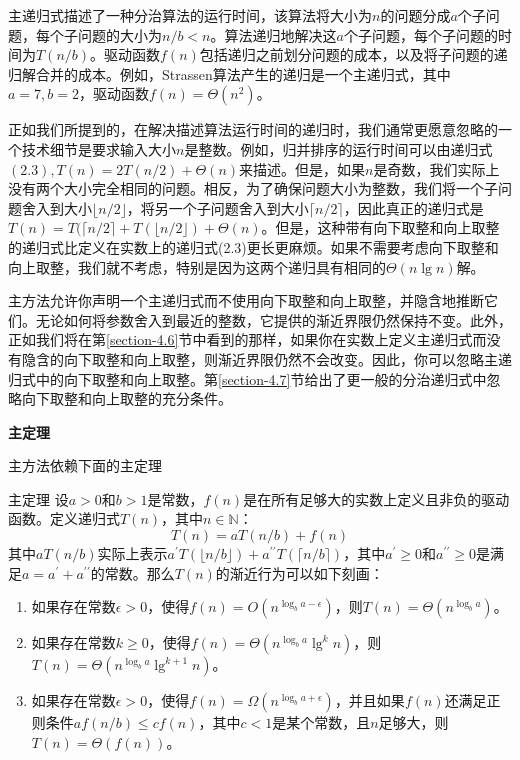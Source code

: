 \documentclass[lang=cn,newtx,10pt,scheme=chinese]{elegantbook}
\begin{document}
主递归式描述了一种分治算法的运行时间，该算法将大小为$n$的问题分成$a$个子问题，每个子问题的大小为$n / b<n$。算法递归地解决这$a$个子问题，每个子问题的时间为$T(n / b)$。驱动函数$f(n)$包括递归之前划分问题的成本，以及将子问题的递归解合并的成本。例如，Strassen算法产生的递归是一个主递归式，其中$a=7, b=2$，驱动函数$f(n)=\Theta(n^2)$。

正如我们所提到的，在解决描述算法运行时间的递归时，我们通常更愿意忽略的一个技术细节是要求输入大小$n$是整数。例如，归并排序的运行时间可以由递归式$(2.3), T(n)=2 T(n / 2)+\Theta(n)$来描述。但是，如果$n$是奇数，我们实际上没有两个大小完全相同的问题。相反，为了确保问题大小为整数，我们将一个子问题舍入到大小$\lfloor n / 2\rfloor$，将另一个子问题舍入到大小$\lceil n / 2\rceil$，因此真正的递归式是$T(n)=T(\lceil n / 2\rceil+T(\lfloor n / 2\rfloor)+\Theta(n)$。但是，这种带有向下取整和向上取整的递归式比定义在实数上的递归式(2.3)更长更麻烦。如果不需要考虑向下取整和向上取整，我们就不考虑，特别是因为这两个递归具有相同的$\Theta(n \lg n)$解。

主方法允许你声明一个主递归式而不使用向下取整和向上取整，并隐含地推断它们。无论如何将参数舍入到最近的整数，它提供的渐近界限仍然保持不变。此外，正如我们将在第\ref{section-4.6}节中看到的那样，如果你在实数上定义主递归式而没有隐含的向下取整和向上取整，则渐近界限仍然不会改变。因此，你可以忽略主递归式中的向下取整和向上取整。第\ref{section-4.7}节给出了更一般的分治递归式中忽略向下取整和向上取整的充分条件。

\textbf{主定理}

主方法依赖下面的主定理

\begin{theorem}{主定理}{}
设$a>0$和$b>1$是常数，$f(n)$是在所有足够大的实数上定义且非负的驱动函数。定义递归式$T(n)$，其中$n \in \mathbb{N}$：
$$
T(n)=a T(n / b)+f(n)
$$
其中$a T(n / b)$实际上表示$a^{\prime} T(\lfloor n / b\rfloor)+a^{\prime \prime} T(\lceil n / b\rceil)$，其中$a^{\prime} \geq 0$和$a^{\prime \prime} \geq 0$是满足$a=a^{\prime}+a^{\prime \prime}$的常数。那么$T(n)$的渐近行为可以如下刻画：
\begin{enumerate}
\item 如果存在常数$\epsilon>0$，使得$f(n)=O\left(n^{\log _b a-\epsilon}\right)$，则$T(n)=\Theta\left(n^{\log _b a}\right)$。
\item 如果存在常数$k \geq 0$，使得$f(n)=\Theta\left(n^{\log _b a} \lg ^k n\right)$，则$T(n)=\Theta\left(n^{\log _b a} \lg ^{k+1} n\right)$。
\item 如果存在常数$\epsilon>0$，使得$f(n)=\Omega\left(n^{\log _b a+\epsilon}\right)$，并且如果$f(n)$还满足正则条件$a f(n / b) \leq c f(n)$，其中$c<1$是某个常数，且$n$足够大，则$T(n)=\Theta(f(n))$。
\end{enumerate}
\end{theorem}
\end{document}
